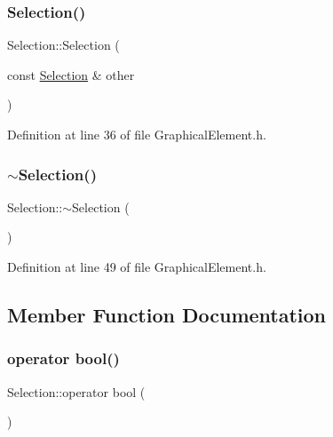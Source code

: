 \subsubsection{\texorpdfstring{Selection()}{Selection()}\hspace{0.1cm}{\footnotesize\ttfamily [3/3]}}
{\footnotesize\ttfamily Selection\+::\+Selection (\begin{DoxyParamCaption}\item[{const \hyperlink{struct_selection}{Selection} \&}]{other }\end{DoxyParamCaption})\hspace{0.3cm}{\ttfamily [inline]}}



Definition at line 36 of file Graphical\+Element.\+h.

\mbox{\label{struct_selection_a1860ec524d11c03de8c10a9354319839}} 
\subsubsection{\texorpdfstring{$\sim$\+Selection()}{~Selection()}}
{\footnotesize\ttfamily Selection\+::$\sim$\+Selection (\begin{DoxyParamCaption}{ }\end{DoxyParamCaption})\hspace{0.3cm}{\ttfamily [inline]}}



Definition at line 49 of file Graphical\+Element.\+h.



\subsection{Member Function Documentation}
\mbox{\label{struct_selection_a9cb09f5188184533a125351105990a0a}} 
\subsubsection{\texorpdfstring{operator bool()}{operator bool()}}
{\footnotesize\ttfamily Selection\+::operator bool (\begin{DoxyParamCaption}{ }\end{DoxyParamCaption})\hspace{0.3cm}{\ttfamily [inline]}}



